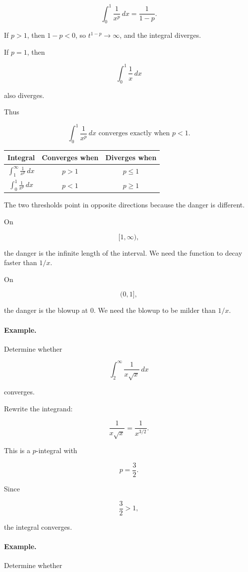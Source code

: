 \[
\int_0^1 \frac1{x^p}\,dx
=
\frac1{1-p}.
\]

If \(p>1\), then \(1-p<0\), so \(t^{1-p}\to\infty\), and the integral diverges.

If \(p=1\), then

\[
\int_0^1 \frac1x\,dx
\]

also diverges.

Thus

\[
\boxed{
\int_0^1 \frac1{x^p}\,dx
\text{ converges exactly when } p<1.
}
\]

\begin{center}
\begin{tabular}{c|c|c}
\textbf{Integral} & \textbf{Converges when} & \textbf{Diverges when} \\ \hline
\(\displaystyle \int_1^\infty \frac1{x^p}\,dx\) & \(p>1\) & \(p\le1\) \\[8pt]
\(\displaystyle \int_0^1 \frac1{x^p}\,dx\) & \(p<1\) & \(p\ge1\)
\end{tabular}
\end{center}

The two thresholds point in opposite directions because the danger is different.

On

\[
[1,\infty),
\]

the danger is the infinite length of the interval.  We need the function to decay faster
than \(1/x\).

On

\[
(0,1],
\]

the danger is the blowup at \(0\).  We need the blowup to be milder than \(1/x\).

\paragraph{Example.}
Determine whether

\[
\int_2^\infty \frac{1}{x\sqrt{x}}\,dx
\]

converges.

Rewrite the integrand:

\[
\frac{1}{x\sqrt{x}}
=
\frac1{x^{3/2}}.
\]

This is a \(p\)-integral with

\[
p=\frac32.
\]

Since

\[
\frac32>1,
\]

the integral converges.

\paragraph{Example.}
Determine whether

